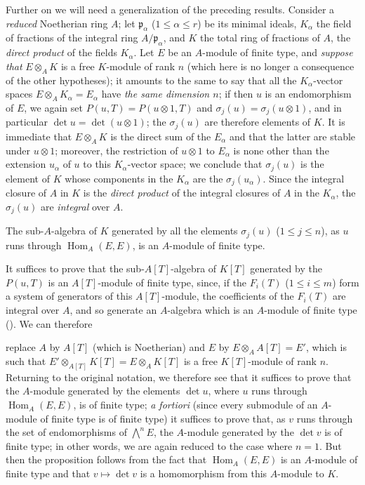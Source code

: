 \begin{remark}[6.4.7]
\label{II.6.4.7}
Further on we will need a generalization of the preceding results. Consider
a \emph{reduced} Noetherian ring $A$; let $\mathfrak{p}_\alpha$
($1\leq\alpha\leq r$) be its minimal ideals, $K_\alpha$ the field of
fractions of the integral ring $A/\mathfrak{p}_\alpha$, and $K$ the total
ring of fractions of $A$, the \emph{direct product} of the fields
$K_\alpha$. Let $E$ be an $A$-module of finite type, and \emph{suppose that}
$E\otimes_AK$ is a free $K$-module of rank $n$ (which here is no longer a
consequence of the other hypotheses); it amounts to the same to say that all
the $K_\alpha$-vector spaces $E\otimes_AK_\alpha=E_\alpha$ have \emph{the
same dimension $n$}; if then $u$ is an endomorphism of $E$, we again set
$P(u,T)=P(u\otimes1,T)$ and $\sigma_j(u)=\sigma_j(u\otimes1)$, and in
particular $\det u=\det(u\otimes1)$; the $\sigma_j(u)$ are therefore
elements of $K$. It is immediate that $E\otimes_AK$ is the direct sum of the
$E_\alpha$ and that the latter are stable under $u\otimes1$; moreover, the
restriction of $u\otimes1$ to $E_\alpha$ is none other than the extension
$u_\alpha$ of $u$ to this $K_\alpha$-vector space; we conclude that
$\sigma_j(u)$ is the element of $K$ whose components in the $K_\alpha$ are
the $\sigma_j(u_\alpha)$. Since the integral closure of $A$ in $K$ is the
\emph{direct product} of the integral closures of $A$ in the $K_\alpha$, the
$\sigma_j(u)$ are \emph{integral} over $A$.

\begin{lemma}[6.4.7.1]
\label{II.6.4.7.1}
The sub-$A$-algebra of $K$ generated by all the elements $\sigma_j(u)$
($1\leq j\leq n$), as $u$ runs through $\operatorname{Hom}_A(E,E)$, is an
$A$-module of finite type.
\end{lemma}

It suffices to prove that the sub-$A[T]$-algebra of $K[T]$ generated by the
$P(u,T)$ is an $A[T]$-module of finite type, since, if the $F_i(T)$
($1\leq i\leq m$) form a system of generators of this $A[T]$-module, the
coefficients of the $F_i(T)$ are integral over $A$, and so generate an
$A$-algebra which is an $A$-module of finite type
(\cite[vol.~I, p.~255, Theorem~1]{I-13}). We can therefore


replace $A$ by $A[T]$ (which is Noetherian) and $E$ by
$E\otimes_AA[T]=E'$, which is such that
$E'\otimes_{A[T]}K[T]=E\otimes_AK[T]$ is a free $K[T]$-module of rank $n$.
Returning to the original notation, we therefore see that it suffices to
prove that the $A$-module generated by the elements $\det u$, where $u$ runs
through $\operatorname{Hom}_A(E,E)$, is of finite type; \emph{a fortiori}
(since every submodule of an $A$-module of finite type is of finite type) it
suffices to prove that, as $v$ runs through the set of endomorphisms of
$\bigwedge^nE$, the $A$-module generated by the $\det v$ is of finite type;
in other words, we are again reduced to the case where $n=1$. But then the
proposition follows from the fact that $\operatorname{Hom}_A(E,E)$ is an
$A$-module of finite type and that $v\mapsto\det v$ is a homomorphism from
this $A$-module to $K$.


\end{remark}
